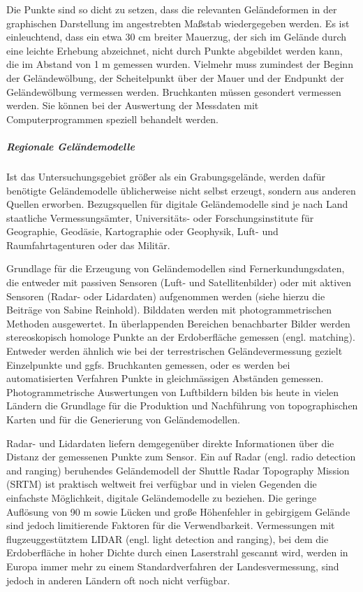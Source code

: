 Die Punkte sind so dicht zu setzen, dass die relevanten Geländeformen in der graphischen Darstellung im angestrebten Maßstab wiedergegeben werden. Es ist einleuchtend, dass ein etwa 30 cm breiter Mauerzug, der sich im Gelände durch eine leichte Erhebung abzeichnet, nicht durch Punkte abgebildet werden kann, die im Abstand von 1 m gemessen wurden. Vielmehr muss zumindest der Beginn der Geländewölbung, der Scheitelpunkt über der Mauer und der Endpunkt der Geländewölbung vermessen werden. Bruchkanten müssen gesondert vermessen werden. Sie können bei der Auswertung der Messdaten mit Computerprogrammen speziell behandelt werden.

\subparagraph{Regionale Geländemodelle}
Ist das Untersuchungsgebiet größer als ein Grabungsgelände, werden dafür benötigte Geländemodelle üblicherweise nicht selbst erzeugt, sondern aus anderen Quellen erworben. Bezugsquellen für digitale Geländemodelle sind je nach Land staatliche Vermessungsämter, Universitäts- oder Forschungsinstitute für Geographie, Geodäsie, Kartographie oder Geophysik, Luft- und Raumfahrtagenturen oder das Militär.

Grundlage für die Erzeugung von Geländemodellen sind Fernerkundungsdaten, die entweder mit passiven Sensoren (Luft- und Satellitenbilder) oder mit aktiven Sensoren (Radar- oder Lidardaten) aufgenommen werden (siehe hierzu die Beiträge von Sabine Reinhold). Bilddaten werden mit photogrammetrischen Methoden ausgewertet. In überlappenden Bereichen benachbarter Bilder werden stereoskopisch homologe Punkte an der Erdoberfläche gemessen (engl. matching). Entweder werden ähnlich wie bei der terrestrischen Geländevermessung gezielt Einzelpunkte und ggfs. Bruchkanten gemessen, oder es werden bei automatisierten Verfahren Punkte in gleichmässigen Abständen gemessen. Photogrammetrische Auswertungen von Luftbildern bilden bis heute in vielen Ländern die Grundlage für die Produktion und Nachführung von topographischen Karten und für die Generierung von Geländemodellen.

Radar- und Lidardaten liefern demgegenüber direkte Informationen über die Distanz der gemessenen Punkte zum Sensor. Ein auf Radar (engl. radio detection and ranging) beruhendes Geländemodell der Shuttle Radar Topography Mission (SRTM) ist praktisch weltweit frei verfügbar und in vielen Gegenden die einfachste Möglichkeit, digitale Geländemodelle zu beziehen. Die geringe Auflösung von 90 m sowie Lücken und große Höhenfehler in gebirgigem Gelände sind jedoch limitierende Faktoren für die Verwendbarkeit. Vermessungen mit flugzeuggestütztem LIDAR (engl. light detection and ranging), bei dem die Erdoberfläche in hoher Dichte durch einen Laserstrahl gescannt wird, werden in Europa immer mehr zu einem Standardverfahren der Landesvermessung, sind jedoch in anderen Ländern oft noch nicht verfügbar.

